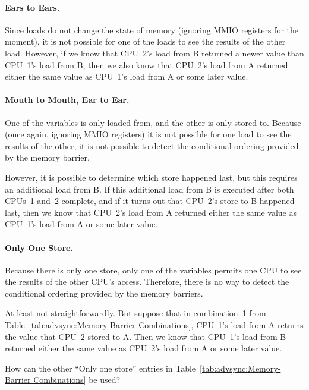 \paragraph{Ears to Ears.}
	Since loads do not change the state of memory
	(ignoring MMIO registers for the moment),
	it is not possible for one of the loads to see the
	results of the other load.
	However, if we know that CPU~2's load from B returned a
	newer value than CPU~1's load from B, then we also know
	that CPU~2's load from A returned either the same value
	as CPU~1's load from A or some later value.

\paragraph{Mouth to Mouth, Ear to Ear.}
	One of the variables is only loaded from, and the other
	is only stored to.
	Because (once again, ignoring MMIO registers) it is not
	possible for one load to see the results of the other,
	it is not possible to detect the conditional ordering
	provided by the memory barrier.

	However, it is possible to determine which store happened
	last, but this requires an additional load from B.
	If this additional load from B is executed after both
	CPUs~1 and~2 complete, and if it turns out that CPU~2's
	store to B happened last, then we know
	that CPU~2's load from A returned either the same value
	as CPU~1's load from A or some later value.

\paragraph{Only One Store.}
	Because there is only one store, only one of the variables
	permits one CPU to see the results of the other CPU's
	access.
	Therefore, there is no way to detect the
	conditional ordering provided by the memory barriers.

	At least not straightforwardly.
	But suppose that in combination~1 from
	Table~\ref{tab:advsync:Memory-Barrier Combinations},
	CPU~1's load from A returns the value that CPU~2 stored
	to A.  Then we know that CPU~1's load from B returned
	either the same value as CPU~2's load from A or some later value.

\QuickQuiz{}
	How can the other ``Only one store'' entries in
	Table~\ref{tab:advsync:Memory-Barrier Combinations}
	be used?
 \QuickQuizEnd

